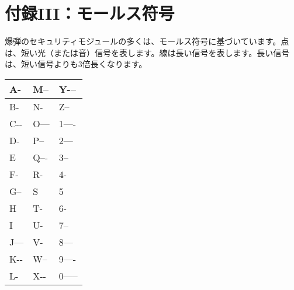 \section*{付録III：モールス符号}

爆弾のセキュリティモジュールの多くは、モールス符号に基づいています。点は、短い光（または音）信号を表します。線は長い信号を表します。長い信号は、短い信号よりも3倍長くなります。

\vspace*{1em}

\newcommand{\dt}{\kern-0.5pt\raisebox{0.4ex}{.}}

\bgroup
\Large
\def\arraystretch{1.5}
\begin{tabular}{|p{}|p{}|p{}|}
\hline
A\quad \dt-         & M\quad --         & Y\quad -\dt-- \\ \hline
B\quad -\dt\dt\dt   & N\quad -\dt       & Z\quad --\dt\dt \\ \hline
C\quad -\dt-\dt     & O\quad ---        & 1\quad \dt---- \\ \hline
D\quad -\dt\dt      & P\quad \dt--\dt   & 2\quad \dt\dt--- \\ \hline
E\quad \dt          & Q\quad --\dt-     & 3\quad \dt\dt\dt-- \\ \hline
F\quad \dt\dt-\dt   & R\quad \dt-\dt    & 4\quad \dt\dt\dt\dt- \\ \hline
G\quad --\dt        & S\quad \dt\dt\dt  & 5\quad \dt\dt\dt\dt\dt \\ \hline
H\quad \dt\dt\dt\dt & T\quad -          & 6\quad -\dt\dt\dt\dt \\ \hline
I\quad \dt\dt       & U\quad \dt\dt-    & 7\quad --\dt\dt\dt \\ \hline
J\quad \dt---       & V\quad \dt\dt\dt- & 8\quad ---\dt\dt \\ \hline
K\quad -\dt-        & W\quad \dt--      & 9\quad ----\dt \\ \hline
L\quad \dt-\dt\dt   & X\quad -\dt\dt-   & 0\quad ----- \\ \hline
\end{tabular}
\egroup
